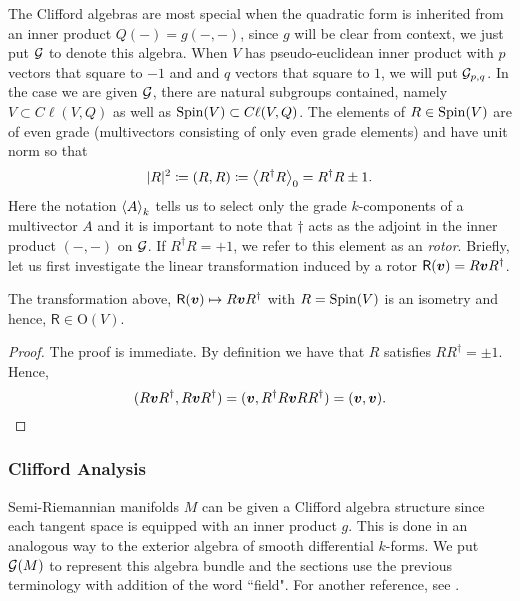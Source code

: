 \documentclass[conf]{new-aiaa}
\begin{document}
The Clifford algebras are most special when the quadratic form is inherited from an inner product $Q(-)=g(-,-)$, since $g$ will be clear from context, we just put $\G$ to denote this algebra. When $V$ has pseudo-euclidean inner product with $p$ vectors that square to $-1$ and and $q$ vectors that square to $1$, we will put $\G_{p,q}$. In the case we are given $\G$, there are natural subgroups contained, namely $V\subset C\ell(V,Q)$ as well as $\sping(V) \subset C\ell(V,Q)$. The elements of $R\in \sping(V)$ are of even grade (multivectors consisting of only even grade elements) and have unit norm so that 
\begin{equation}
|R|^2 \coloneqq (R,R) \coloneqq \proj{0}{R^\dagger R}= R^\dagger R\pm 1.
\end{equation}
Here the notation $\proj{k}{A}$ tells us to select only the grade $k$-components of a multivector $A$ and it is important to note that $\dagger$ acts as the adjoint in the inner product $(-,-)$ on $\G$. If $R^\dagger R = +1$, we refer to this element as an \emph{rotor}. Briefly, let us first investigate the linear transformation induced by a rotor $\mathsf{R}({\blade{v}})=R \blade{v} R^\dagger$. 
\begin{proposition}
\label{prop:orthogonal_transformation}
The transformation above, $\mathsf{R}(\blade{v}) \mapsto R\blade{v}R^\dagger$ with $R=\sping(V)$ is an isometry and hence, $\mathsf{R}\in \mathrm{O}(V)$.
\end{proposition}
\begin{proof}
The proof is immediate. By definition we have that $R$ satisfies $RR^\dagger = \pm 1$. Hence,
\begin{equation}
    (R\blade{v}R^\dagger,R\blade{v}R^\dagger) = (\blade{v},R^\dagger R \blade{v} RR^\dagger) = (\blade{v},\blade{v}).
\end{equation}
\end{proof}

\subsubsection{Clifford Analysis}

Semi-Riemannian manifolds $M$ can be given a Clifford algebra structure since each tangent space is equipped with an inner product $g$. This is done in an analogous way to the exterior algebra of smooth differential $k$-forms. We put $\G(M)$ to represent this algebra bundle and the sections use the previous terminology with addition of the word ``field". For another reference, see \cite{schindler_geometric_2020}. 
\end{document}
